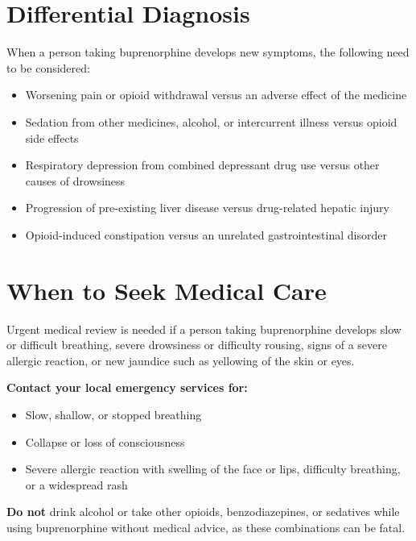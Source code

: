 \section*{Differential Diagnosis}
When a person taking buprenorphine develops new symptoms, the following need to be considered:
\begin{itemize}
    \item Worsening pain or opioid withdrawal versus an adverse effect of the medicine
    \item Sedation from other medicines, alcohol, or intercurrent illness versus opioid side effects
    \item Respiratory depression from combined depressant drug use versus other causes of drowsiness
    \item Progression of pre-existing liver disease versus drug-related hepatic injury
    \item Opioid-induced constipation versus an unrelated gastrointestinal disorder
\end{itemize}

\section*{When to Seek Medical Care}
Urgent medical review is needed if a person taking buprenorphine develops slow or difficult breathing, severe drowsiness or difficulty rousing, signs of a severe allergic reaction, or new jaundice such as yellowing of the skin or eyes.

\textbf{Contact your local emergency services for:}
\begin{itemize}
    \item Slow, shallow, or stopped breathing
    \item Collapse or loss of consciousness
    \item Severe allergic reaction with swelling of the face or lips, difficulty breathing, or a widespread rash
\end{itemize}

\textbf{Do not} drink alcohol or take other opioids, benzodiazepines, or sedatives while using buprenorphine without medical advice, as these combinations can be fatal.


